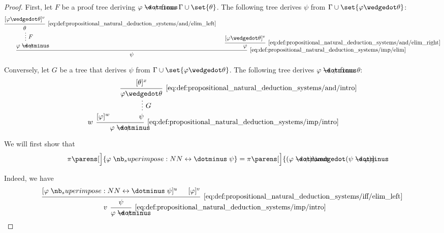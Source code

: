 \begin{proof}

  First, let \( F \) be a proof tree deriving \( \varphi \synimplies \psi \) from \( \Gamma \cup \set{ \theta } \). The following tree derives \( \psi \) from \( \Gamma \cup \set{ \varphi \synwedge \theta } \):
  \begin{equation*}
    \begin{prooftree}
      \hypo{ [\varphi \synwedge \theta]^v }
      \infer1[\ref{eq:def:propositional_natural_deduction_systems/and/elim_left}]{ \theta }

      \ellipsis {\( F \)} {\varphi \synimplies \psi}

      \hypo{ [\varphi \synwedge \theta]^v }
      \infer1[\ref{eq:def:propositional_natural_deduction_systems/and/elim_right}]{ \varphi }

      \infer2[\ref{eq:def:propositional_natural_deduction_systems/imp/elim}]{ \psi }
    \end{prooftree}
  \end{equation*}

  Conversely, let \( G \) be a tree that derives \( \psi \) from \( \Gamma \cup \set{ \varphi \synwedge \theta } \). The following tree derives \( \varphi \synimplies \psi \) from \( \theta \):
  \begin{equation*}
    \begin{prooftree}
      \hypo{ [\varphi]^w }
      \hypo{ [\theta]^x }
      \infer1[\ref{eq:def:propositional_natural_deduction_systems/and/intro}]{ \varphi \synwedge \theta }

      \ellipsis {\( G \)} {\psi}

      \infer[left label=\( w \)]2[\ref{eq:def:propositional_natural_deduction_systems/imp/intro}]{ \varphi \synimplies \psi }
    \end{prooftree}
  \end{equation*}

   We will first show that
  \begin{equation*}
    \pi\parens[\Big]{ \varphi \syniff \psi } = \pi\parens[\Big]{ (\varphi \synimplies \psi) \synwedge (\psi \synimplies \varphi) }.
  \end{equation*}

  Indeed, we have
  \begin{equation*}
    \begin{prooftree}
      \hypo{ [\varphi \syniff \psi]^u }
      \hypo{ [\varphi]^v }
      \infer2[\ref{eq:def:propositional_natural_deduction_systems/iff/elim_left}]{ \psi }
      \infer[left label=\( v \)]1[\ref{eq:def:propositional_natural_deduction_systems/imp/intro}]{ \varphi \synimplies \psi }


\end{prooftree}
\end{equation*}
\end{proof}
